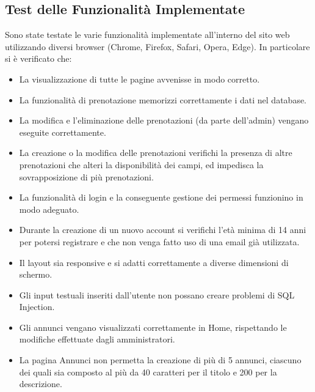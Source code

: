 \documentclass{article}
\begin{document}
\subsection{Test delle Funzionalità Implementate}

Sono state testate le varie funzionalità implementate all'interno del sito web utilizzando diversi browser (Chrome, Firefox, Safari, Opera, Edge). In particolare si è verificato che:

\begin{itemize}
    \item La visualizzazione di tutte le pagine avvenisse in modo corretto.
    
    \item La funzionalità di prenotazione memorizzi correttamente i dati nel database.
    
    \item La modifica e l'eliminazione delle prenotazioni (da parte dell'admin) vengano eseguite correttamente.

    \item La creazione o la modifica delle prenotazioni verifichi la presenza di altre prenotazioni che alteri la disponibilità dei campi, ed impedisca la sovrapposizione di più prenotazioni.
    
    \item La funzionalità di login e la conseguente gestione dei permessi funzionino in modo adeguato.

    \item Durante la creazione di un nuovo account si verifichi l'età  minima di 14 anni per potersi registrare e che non venga fatto uso di una email già utilizzata.
    
    \item Il layout sia responsive e si adatti correttamente a diverse dimensioni di schermo.

    \item Gli input testuali inseriti dall'utente non possano creare problemi di SQL Injection.

    \item Gli annunci vengano visualizzati correttamente in Home, rispettando le modifiche effettuate dagli amministratori.

    \item La pagina Annunci non permetta la creazione di più di 5 annunci, ciascuno dei quali sia composto al più da 40 caratteri per il titolo e 200 per la descrizione.
\end{itemize}
\end{document}
